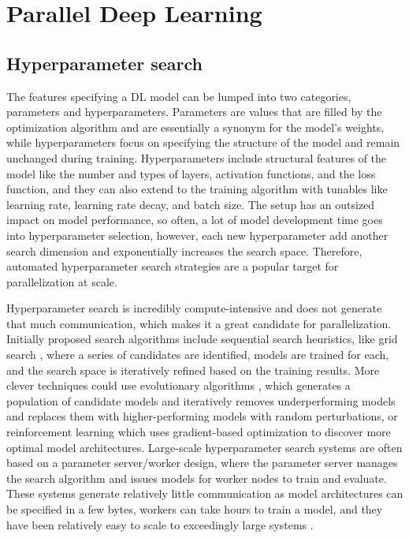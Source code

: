 \section{Parallel Deep Learning}

\subsection{Hyperparameter search}
The features specifying a DL model can be lumped into two categories, parameters and hyperparameters.
Parameters are values that are filled by the optimization algorithm and are essentially a synonym for the model's weights, while hyperparameters focus on specifying the structure of the model and remain unchanged during training.
Hyperparameters include structural features of the model like the number and types of layers, activation functions, and the loss function, and they can also extend to the training algorithm with tunables like learning rate, learning rate decay, and batch size.
The setup has an outsized impact on model performance, so often, a lot of model development time goes into hyperparameter selection, however, each new hyperparameter add another search dimension and exponentially increases the search space.
Therefore, automated hyperparameter search strategies are a popular target for parallelization at scale.

Hyperparameter search is incredibly compute-intensive and does not generate that much communication, which makes it a great candidate for parallelization.
Initially proposed search algorithms include sequential search heuristics, like grid search \cite{Hadjis2016Omnivore}, where a series of candidates are identified, models are trained for each, and the search space is iteratively refined based on the training results.
More clever techniques could use evolutionary algorithms \cite{Young2017EvolveNLWithHPC, Real2017LargeScaleEvolutionOfCV}, which generates a population of candidate models and iteratively removes underperforming models and replaces them with higher-performing models with random perturbations, or reinforcement learning \cite{Zoph2017NeuralArchSearchReinformceLearn} which uses gradient-based optimization to discover more optimal model architectures.
Large-scale hyperparameter search systems are often based on a parameter server/worker design, where the parameter server manages the search algorithm and issues models for worker nodes to train and evaluate.
These systems generate relatively little communication as model architectures can be specified in a few bytes, workers can take hours to train a model, and they have been relatively easy to scale to exceedingly large systems \cite{Young2017EvolveNLWithHPC}.

